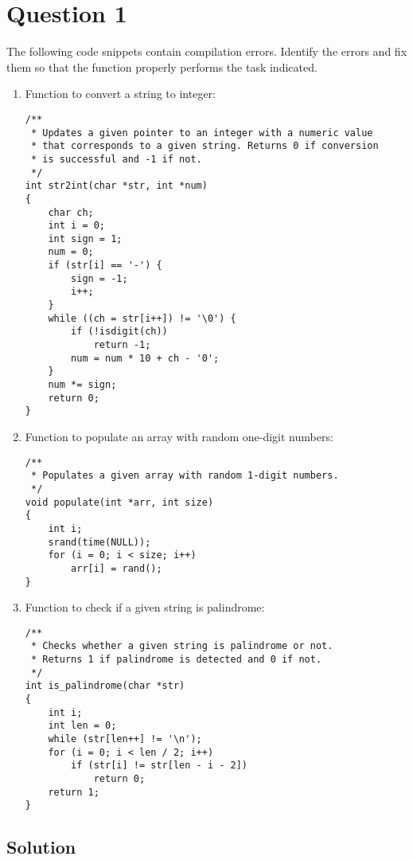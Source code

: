 \documentclass[12pt,letterpaper,twoside]{article}
\begin{document}


\section*{Question 1}

The following code snippets contain compilation errors.
Identify the errors and fix them so that the function properly performs the task indicated.

\begin{enumerate}[label=\textbf{(\alph*)}]

\item Function to convert a string to integer:
\begin{lstlisting}
/**
 * Updates a given pointer to an integer with a numeric value
 * that corresponds to a given string. Returns 0 if conversion
 * is successful and -1 if not.
 */
int str2int(char *str, int *num)
{
	char ch;
	int i = 0;
	int sign = 1;
	num = 0;
	if (str[i] == '-') {
		sign = -1;
		i++;
	}
	while ((ch = str[i++]) != '\0') {
		if (!isdigit(ch))
			return -1;
		num = num * 10 + ch - '0';
	}
	num *= sign;
	return 0;
}
\end{lstlisting}

\item Function to populate an array with random one-digit numbers:
\begin{lstlisting}
/**
 * Populates a given array with random 1-digit numbers.
 */
void populate(int *arr, int size)
{
	int i;
	srand(time(NULL));
	for (i = 0; i < size; i++)
		arr[i] = rand();
}
\end{lstlisting}

\item Function to check if a given string is palindrome:
\begin{lstlisting}
/**
 * Checks whether a given string is palindrome or not.
 * Returns 1 if palindrome is detected and 0 if not.
 */
int is_palindrome(char *str)
{
	int i;
	int len = 0;
	while (str[len++] != '\n');
	for (i = 0; i < len / 2; i++)
		if (str[i] != str[len - i - 2])
			return 0;
	return 1;
}
\end{lstlisting}

\end{enumerate}

\subsection*{Solution}
\end{document}
